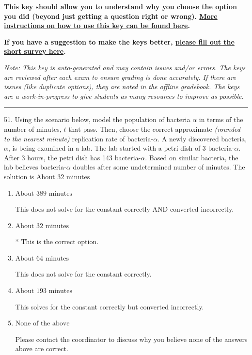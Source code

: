 \documentclass{extbook}[14pt]
\begin{document}
\textbf{This key should allow you to understand why you choose the option you did (beyond just getting a question right or wrong). \href{https://xronos.clas.ufl.edu/mac1105spring2020/courseDescriptionAndMisc/Exams/LearningFromResults}{More instructions on how to use this key can be found here}.}

\textbf{If you have a suggestion to make the keys better, \href{https://forms.gle/CZkbZmPbC9XALEE88}{please fill out the short survey here}.}

\textit{Note: This key is auto-generated and may contain issues and/or errors. The keys are reviewed after each exam to ensure grading is done accurately. If there are issues (like duplicate options), they are noted in the offline gradebook. The keys are a work-in-progress to give students as many resources to improve as possible.}

\rule{\textwidth}{0.4pt}

51. Using the scenario below, model the population of bacteria $\alpha$ in terms of the number of minutes, $t$ that pass. Then, choose the correct approximate \textit{(rounded to the nearest minute)} replication rate of bacteria-$\alpha$.
A newly discovered bacteria, $\alpha$, is being examined in a lab. The lab started with a petri dish of 3 bacteria-$\alpha$. After 3 hours, the petri dish has 143 bacteria-$\alpha$. Based on similar bacteria, the lab believes bacteria-$\alpha$ doubles after some undetermined number of minutes. 
The solution is $ \text{About } 32 \text{ minutes} $ 

\begin{enumerate}[label=\Alph*.] 
\item $ \text{About } 389 \text{ minutes} $ 

 This does not solve for the constant correctly AND converted incorrectly. 
\item $ \text{About } 32 \text{ minutes} $ 

 * This is the correct option. 
\item $ \text{About } 64 \text{ minutes} $ 

 This does not solve for the constant correctly. 
\item $ \text{About } 193 \text{ minutes} $ 

 This solves for the constant correctly but converted incorrectly. 
\item $ \text{None of the above} $ 

 Please contact the coordinator to discuss why you believe none of the answers above are correct. 
\end{enumerate} 
 
\end{document}

